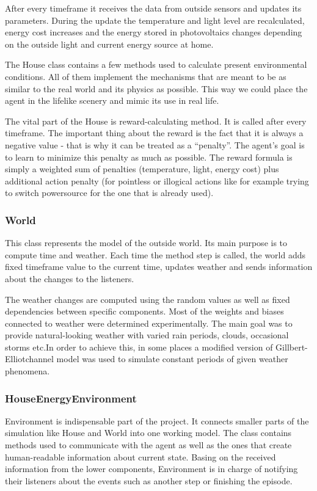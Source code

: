 \documentclass{article}
\begin{document}
After every timeframe it receives the data from outside sensors and updates its parameters. During the update the temperature and light level are recalculated, energy cost increases and the energy stored in photovoltaics changes depending on the outside light and current energy source at home.

The House class contains a few methods used to calculate present environmental conditions. All of them implement the mechanisms that are meant to be as similar to the real world and its physics as possible. This way we could place the agent in the lifelike scenery and mimic its use in real life.

The vital part of the House is reward-calculating method. It is called after every timeframe. The important thing about the reward is the fact that it is always a negative value - that is why it can be treated as a “penalty”. The agent’s goal is to learn to minimize this penalty as much as possible. The reward formula is simply a weighted sum of penalties (temperature, light, energy cost) plus additional action penalty (for pointless or illogical actions like for example trying to switch powersource for the one that is already used). 

\subsubsection{World}
This class represents the model of the outside world. Its main purpose is to compute time and weather. Each time the method step is called, the world adds fixed timeframe value to the current time, updates weather and sends information about the changes to the listeners.

The weather changes are computed using the random values as well as fixed dependencies between specific components. Most of the weights and biases connected to weather were determined experimentally. The main goal was to provide natural-looking weather with varied rain periods, clouds, occasional storms etc.In order to achieve this, in some places a modified version of Gillbert-Elliotchannel model was used to simulate constant periods of given weather phenomena.

\subsubsection{HouseEnergyEnvironment}
Environment is indispensable part of the project. It connects smaller parts of the simulation like House and World into one working model. The class contains methods used to communicate with the agent as well as the ones that create human-readable information about current state.    Basing on the received information from the lower components, Environment is in charge of notifying their listeners about the events such as another step or finishing the episode.
\end{document}
